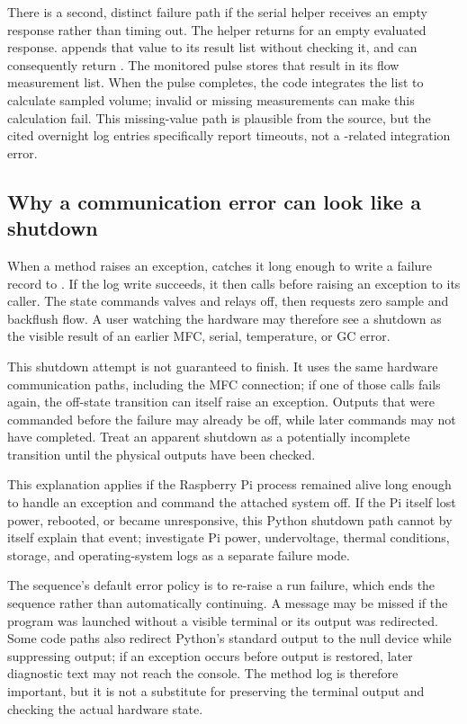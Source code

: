 There is a second, distinct failure path if the serial helper receives an
empty response rather than timing out. The helper returns  for an
empty evaluated response.  appends that value to its result
list without checking it, and  can consequently
return . The monitored pulse stores that result in its flow
measurement list. When the pulse completes, the code integrates the list to
calculate sampled volume; invalid or missing measurements can make this
calculation fail. This missing-value path is plausible from the source, but
the cited overnight log entries specifically report timeouts, not a
-related integration error.

\subsection{Why a communication error can look like a shutdown}

When a method raises an exception,  catches it long
enough to write a failure record to . If the log
write succeeds, it then calls  before raising an
exception to its caller. The  state commands valves and relays off,
then requests zero sample and backflush flow. A user watching the hardware
may therefore see a shutdown as the visible result of an earlier MFC, serial,
temperature, or GC error.

This shutdown attempt is not guaranteed to finish. It uses the same hardware
communication paths, including the MFC connection; if one of those calls
fails again, the off-state transition can itself raise an exception. Outputs
that were commanded before the failure may already be off, while later
commands may not have completed. Treat an apparent shutdown as a potentially
incomplete transition until the physical outputs have been checked.

This explanation applies if the Raspberry Pi process remained alive long
enough to handle an exception and command the attached system off. If the Pi
itself lost power, rebooted, or became unresponsive, this Python shutdown path
cannot by itself explain that event; investigate Pi power, undervoltage,
thermal conditions, storage, and operating-system logs as a separate failure
mode.

The sequence's default error policy is to re-raise a run failure, which ends
the sequence rather than automatically continuing. A message may be missed
if the program was launched without a visible terminal or its output was
redirected. Some code paths also redirect Python's standard output to the
null device while suppressing output; if an exception occurs before output
is restored, later diagnostic text may not reach the console. The method log
is therefore important, but it is not a substitute for preserving the
terminal output and checking the actual hardware state.

